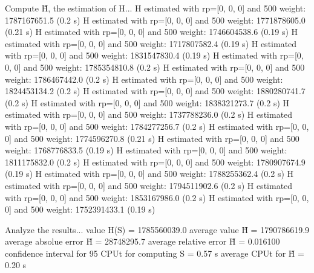 Compute H̃, the estimation of H...
  H estimated with rp=[0, 0, 0] and 500 weight:  1787167651.5  (0.2 s)
  H estimated with rp=[0, 0, 0] and 500 weight:  1771878605.0  (0.21 s)
  H estimated with rp=[0, 0, 0] and 500 weight:  1746604538.6  (0.19 s)
  H estimated with rp=[0, 0, 0] and 500 weight:  1717807582.4  (0.19 s)
  H estimated with rp=[0, 0, 0] and 500 weight:  1831547830.4  (0.19 s)
  H estimated with rp=[0, 0, 0] and 500 weight:  1785354810.8  (0.2 s)
  H estimated with rp=[0, 0, 0] and 500 weight:  1786467442.0  (0.2 s)
  H estimated with rp=[0, 0, 0] and 500 weight:  1824453134.2  (0.2 s)
  H estimated with rp=[0, 0, 0] and 500 weight:  1880280741.7  (0.2 s)
  H estimated with rp=[0, 0, 0] and 500 weight:  1838321273.7  (0.2 s)
  H estimated with rp=[0, 0, 0] and 500 weight:  1737788236.0  (0.2 s)
  H estimated with rp=[0, 0, 0] and 500 weight:  1784277256.7  (0.2 s)
  H estimated with rp=[0, 0, 0] and 500 weight:  1774596270.8  (0.21 s)
  H estimated with rp=[0, 0, 0] and 500 weight:  1768776833.5  (0.19 s)
  H estimated with rp=[0, 0, 0] and 500 weight:  1811175832.0  (0.2 s)
  H estimated with rp=[0, 0, 0] and 500 weight:  1780907674.9  (0.19 s)
  H estimated with rp=[0, 0, 0] and 500 weight:  1788255362.4  (0.2 s)
  H estimated with rp=[0, 0, 0] and 500 weight:  1794511902.6  (0.2 s)
  H estimated with rp=[0, 0, 0] and 500 weight:  1853167986.0  (0.2 s)
  H estimated with rp=[0, 0, 0] and 500 weight:  1752391433.1  (0.19 s)

Analyze the results...
  value H(S)                  = 1785560039.0 
  average value H̃             = 1790786619.9 
  average absolue error H̃     = 28748295.7 
  average relative error H̃    = 0.016100 
  confidence interval for 95%
  CPUt for computing S         = 0.57 s
  average CPUt for H̃           = 0.20 s

